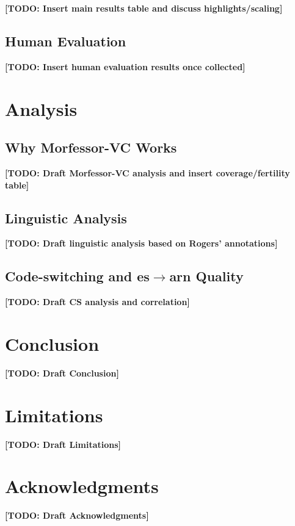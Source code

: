 \documentclass[11pt]{article}
\newcommand{\todo}[1]{\textbf{[TODO: #1]}}
\begin{document}
\todo{Insert main results table and discuss highlights/scaling}

\subsection{Human Evaluation}

\todo{Insert human evaluation results once collected}

\section{Analysis}

\subsection{Why Morfessor-VC Works}

\todo{Draft Morfessor-VC analysis and insert coverage/fertility table}

\subsection{Linguistic Analysis}

\todo{Draft linguistic analysis based on Rogers' annotations}

\subsection{Code-switching and es$\rightarrow$arn Quality}
\label{sec:cs}

\todo{Draft CS analysis and correlation}

\section{Conclusion}

\todo{Draft Conclusion}

\section*{Limitations}

\todo{Draft Limitations}

\section*{Acknowledgments}

\todo{Draft Acknowledgments}


\end{document}
